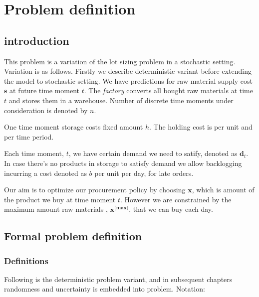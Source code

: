 
\chapter{Problem definition}
\label{chap:prob-def}
\section{introduction}

This problem is a variation of the lot sizing problem in a stochastic setting. Variation is as follows. Firstly we describe deterministic variant before extending the model to stochastic setting. We have predictions for raw material supply cost $\mathbf{s}$ at future time moment $t$. The \emph{factory} converts all bought raw materials at time $t$ and stores them in a warehouse. Number of discrete time moments under consideration is denoted by $n$.

One time moment storage costs fixed amount $h$. The  holding cost is per unit and per time period.

Each time moment, $t$, we have certain demand we need to satify, denoted as $\mathbf{d}_t$. In case there's no products in storage to satisfy demand we allow backlogging incurring a cost denoted as $b$ per unit per day, for late orders.

Our aim is to optimize our procurement policy by choosing $\mathbf{x}$, which is amount of the product we buy at time moment $t$. However we are constrained by the maximum amount raw materials , $\mathbf{x^{\text{(max)}}}$, that we can buy each day.

\section{Formal problem definition}
\label{sec:prob-def}

\subsection{Definitions}
\label{sub:Definitions}

Following is the deterministic problem variant, and in subsequent chapters randomness and uncertainty is embedded into problem. Notation:

